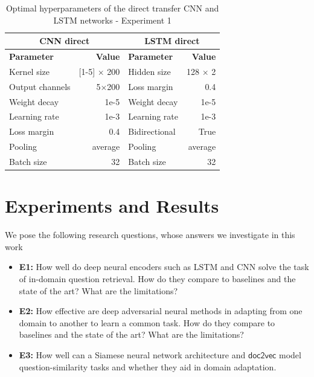 \documentclass{sigkddExp}
\begin{document}
\begin{table}[b]
\begin{tabularx}{\columnwidth}{l|r|l|r}
      \multicolumn{2}{c|}{\textbf{CNN direct}}
     & \multicolumn{2}{c}{\textbf{LSTM direct}}
     \\
     \toprule
     \textbf{Parameter}
     & \textbf{Value}
     & \textbf{Parameter}
     & \textbf{Value}
     \\
     \midrule
     Kernel size
     & [1-5] $\times$ 200
     & Hidden size
     & 128 $\times$ 2
     \\
     Output channels
     & 5$\times$200
     & Loss margin
     & 0.4
     \\
     Weight decay
     & 1e-5 
     & Weight decay
     & 1e-5 
     \\
     Learning rate
     & 1e-3
     & Learning rate
     & 1e-3
     \\
     Loss margin
     & 0.4
     & Bidirectional
     & True
     \\
     Pooling
     & average
     & Pooling
     & average
     \\
     Batch size
     & 32
     & Batch size
     & 32
\end{tabularx}
\caption{Optimal hyperparameters of the direct transfer CNN and LSTM networks - Experiment 1}
\label{tab:param_direct}
\end{table}

\section{Experiments and Results}
\label{experiments}
We pose the following research questions, whose answers we investigate in this work
\begin{itemize}[topsep=0pt,itemsep=-1ex,partopsep=1ex,parsep=1ex]
\item \textbf{E1:} How well do deep neural encoders such as LSTM and CNN solve the task of in-domain question retrieval. How do they compare to baselines and the state of the art? What are the limitations?
\item \textbf{E2:} How effective are deep adversarial neural methods in adapting from one domain to another to learn a common task. How do they compare to baselines and the state of the art? What are the limitations?
\item \textbf{E3:} How well can a Siamese neural network architecture and $\mathsf{doc2vec}$ model question-similarity tasks and whether they aid in domain adaptation.
\end{itemize}
\end{document}
